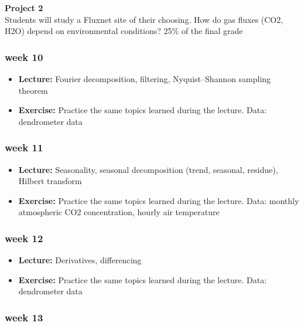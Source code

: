 \documentclass[
  letterpaper,
  DIV=11,
  numbers=noendperiod,
  oneside]{scrreprt}
\providecommand{\tightlist}{%
  \setlength{\itemsep}{0pt}\setlength{\parskip}{0pt}}\usepackage{longtable,booktabs,array}
\begin{document}
\textbf{Project 2}\\
Students will study a Fluxnet site of their choosing. How do gas fluxes
(CO2, H2O) depend on environmental conditions? 25\% of the final grade

\hypertarget{week-10}{%
\subsubsection*{week 10}\label{week-10}}

\begin{itemize}
\tightlist
\item
  \textbf{Lecture:} Fourier decomposition, filtering, Nyquist--Shannon
  sampling theorem
\item
  \textbf{Exercise:} Practice the same topics learned during the
  lecture. Data: dendrometer data
\end{itemize}

\hypertarget{week-11}{%
\subsubsection*{week 11}\label{week-11}}

\begin{itemize}
\tightlist
\item
  \textbf{Lecture:} Seasonality, seasonal decomposition (trend,
  seasonal, residue), Hilbert transform
\item
  \textbf{Exercise:} Practice the same topics learned during the
  lecture. Data: monthly atmospheric CO2 concentration, hourly air
  temperature
\end{itemize}

\hypertarget{week-12}{%
\subsubsection*{week 12}\label{week-12}}

\begin{itemize}
\tightlist
\item
  \textbf{Lecture:} Derivatives, differencing
\item
  \textbf{Exercise:} Practice the same topics learned during the
  lecture. Data: dendrometer data
\end{itemize}

\hypertarget{week-13}{%
\subsubsection*{week 13}\label{week-13}}
\end{document}
